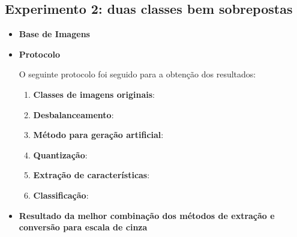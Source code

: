 \subsection{Experimento 2: duas classes bem sobrepostas}

\begin{itemize}
\item[] \textbf{Base de Imagens}


\item[] \textbf{Protocolo}

O seguinte protocolo foi seguido para a obtenção dos resultados:

\begin{enumerate}
\item \textbf{Classes de imagens originais}:
\item \textbf{Desbalanceamento}:
\item \textbf{Método para geração artificial}:
\item \textbf{Quantização}:
\item \textbf{Extração de características}:
\item \textbf{Classificação}:
\end{enumerate}

\item[] \textbf{Resultado da melhor combinação dos métodos de extração e conversão para escala de cinza}


\end{itemize}
